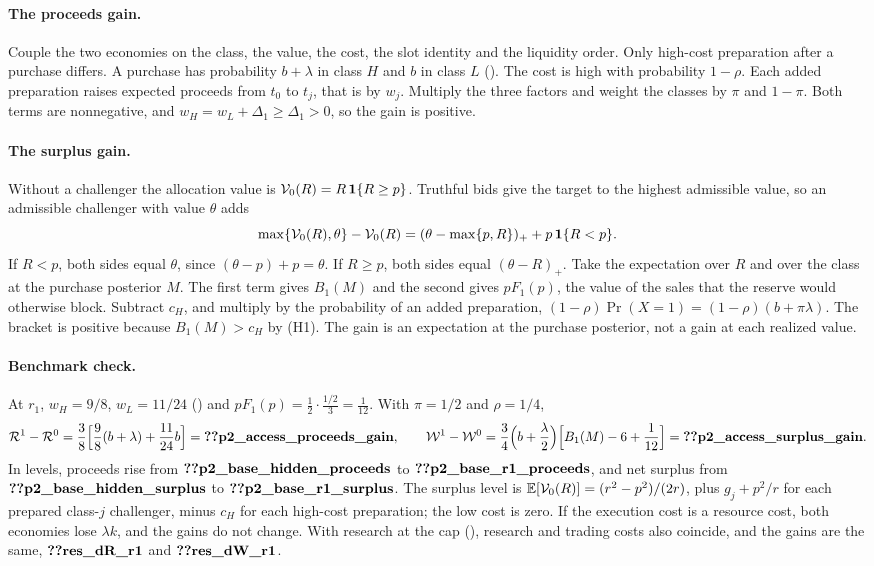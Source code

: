 \paragraph{The proceeds gain.} Couple the two economies on the class, the value, the cost, the slot identity and the
liquidity order. Only high-cost preparation after a purchase differs. A purchase has probability \(b+\lambda\) in class
\(H\) and \(b\) in class \(L\) (). The cost is high with probability \(1-\rho\). Each added
preparation raises expected proceeds from \(t_0\) to \(t_j\), that is by \(w_j\). Multiply the three factors and weight
the classes by \(\pi\) and \(1-\pi\). Both terms are nonnegative, and \(w_H=w_L+\Delta_1\ge\Delta_1>0\), so the gain is positive.

\paragraph{The surplus gain.} Without a challenger the allocation value is \(\mathcal V_0(R)=R\,\mathbf{1}\{R\ge p\}\). Truthful
bids give the target to the highest admissible value, so an admissible challenger with value \(\theta\) adds
\[
\max\{\mathcal V_0(R),\theta\}-\mathcal V_0(R)=(\theta-\max\{p,R\})_++p\,\mathbf{1}\{R<p\}.
\]
If \(R<p\), both sides equal \(\theta\), since \((\theta-p)+p=\theta\). If \(R\ge p\), both sides equal \((\theta-R)_+\).
Take the expectation over \(R\) and over the class at the purchase posterior \(M\). The first term gives \(B_1(M)\) and
the second gives \(pF_1(p)\), the value of the sales that the reserve would otherwise block. Subtract \(c_H\), and
multiply by the probability of an added preparation, \((1-\rho)\Pr(X=1)=(1-\rho)(b+\pi\lambda)\). The bracket is
positive because \(B_1(M)>c_H\) by (H1). The gain is an expectation at the purchase posterior, not a gain at each
realized value.

\paragraph{Benchmark check.} At \(r_1\), \(w_H=9/8\), \(w_L=11/24\) () and
\(pF_1(p)=\tfrac12\cdot\tfrac{1/2}{3}=\tfrac1{12}\). With \(\pi=1/2\) and \(\rho=1/4\),
\[
\mathcal R^1-\mathcal R^0=\frac38\Bigl[\frac98(b+\lambda)+\frac{11}{24}b\Bigr]=\reg{p2_access_proceeds_gain},\qquad
\mathcal W^1-\mathcal W^0=\frac34\Bigl(b+\frac\lambda2\Bigr)\Bigl[B_1(M)-6+\frac1{12}\Bigr]=\reg{p2_access_surplus_gain}.
\]
In levels, proceeds rise from \(\reg{p2_base_hidden_proceeds}\) to \(\reg{p2_base_r1_proceeds}\), and net surplus from
\(\reg{p2_base_hidden_surplus}\) to \(\reg{p2_base_r1_surplus}\). The surplus level is
\(\mathbb{E}[\mathcal V_0(R)]=(r^2-p^2)/(2r)\), plus \(g_j+p^2/r\) for each prepared class-\(j\) challenger, minus \(c_H\) for each
high-cost preparation; the low cost is zero. If
the execution cost is a resource cost, both economies lose \(\lambda k\), and the gains do not change. With research
at the cap (), research and trading costs also coincide, and the gains are the same,
\(\reg{res_dR_r1}\) and \(\reg{res_dW_r1}\).

